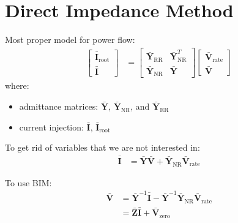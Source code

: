 \documentclass[
]{book}
\providecommand{\tightlist}{%
  \setlength{\itemsep}{0pt}\setlength{\parskip}{0pt}}
\begin{document}
\hypertarget{direct-impedance-method}{%
\section{Direct Impedance Method}\label{direct-impedance-method}}

Most proper model for power flow:
\[ \begin{aligned}
    \left[\begin{array}{c}
    \boldsymbol{\bar{I}}_\text{root} \\
    \boldsymbol{\bar{I}}
    \end{array}\right] &= \left[\begin{array}{cc}
    \boldsymbol{\bar{Y}}_{\text{RR}} & \boldsymbol{\bar{Y}}_{\text{NR}}^{T} \\
    \boldsymbol{\bar{Y}}_{\text{NR}} & \boldsymbol{\bar{Y}}
    \end{array}\right]
    \left[\begin{array}{c}
    \boldsymbol{\bar{V}}_\text{rate} \\
    \boldsymbol{\bar{V}}
    \end{array}\right]
    \nonumber
\end{aligned} \]
where:

\begin{itemize}
\tightlist
\item
  admittance matrices: \(\boldsymbol{\bar{Y}}\),
  \(\boldsymbol{\bar{Y}}_\text{NR}\), and \(\boldsymbol{\bar{Y}}_\text{RR}\)
\item
  current injection: \(\boldsymbol{\bar{I}}\), \(\boldsymbol{\bar{I}}_\text{root}\)
\end{itemize}

To get rid of variables that we are not interested in:
\[ \begin{aligned}
  \boldsymbol{\bar{I}}
  &= \boldsymbol{\bar{Y}} \boldsymbol{\bar{V}}
  + \boldsymbol{\bar{Y}}_\text{NR} \boldsymbol{\bar{V}}_\text{rate}
  \nonumber
\end{aligned} \]

To use BIM:
\[ \begin{aligned}
    \boldsymbol{\bar{V}}
    &= \boldsymbol{\bar{Y}}^{-1} \boldsymbol{\bar{I}}
      - \boldsymbol{\bar{Y}}^{-1} \boldsymbol{\bar{Y}}_\text{NR}
      \boldsymbol{\bar{V}}_\text{rate} \\
    &= \boldsymbol{\bar{Z}} \boldsymbol{\bar{I}}
      + \boldsymbol{\bar{V}}_\text{zero}
\end{aligned} \]
\end{document}
